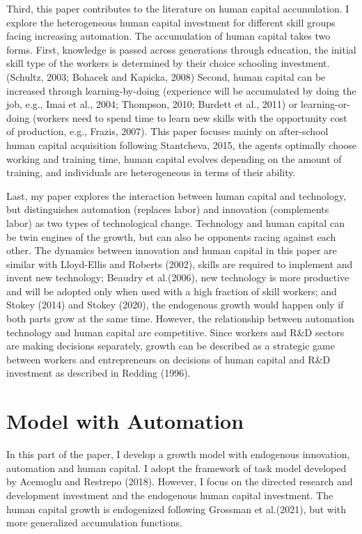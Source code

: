 \documentclass[12pt]{article}
\begin{document}
Third, this paper contributes to the literature on human capital accumulation. I explore the heterogeneous human capital investment for different skill groups facing increasing automation. The accumulation of human capital takes two forms. First, knowledge is passed across generations through education, the initial skill type of the workers is determined by their choice schooling investment. (Schultz, 2003\nocite{Schultz2003}; Bohacek and Kapicka, 2008\nocite{BohacekKapicka2008}) Second, human capital can be increased through learning-by-doing (experience will be accumulated by doing the job, e.g., Imai et al., 2004\nocite{Imaietal2004}; Thompson, 2010\nocite{Thompson2010}; Burdett et al., 2011\nocite{Burdettetal2011}) or learning-or-doing (workers need to spend time to learn new skills with the opportunity cost of production, e.g., Frazis, 2007\nocite{Frazis2007}). This paper focuses mainly on after-school human capital acquisition following Stantcheva, 2015\nocite{Stantcheva2015}, the agents optimally choose working and training time, human capital evolves depending on the amount of training, and individuals are heterogeneous in terms of their ability. 

Last, my paper explores the interaction between human capital and technology, but distinguishes automation (replaces labor) and innovation (complements labor) as two types of technological change. Technology and human capital can be twin engines of the growth, but can also be opponents racing against each other. The dynamics between innovation and human capital in this paper are similar with Lloyd-Ellis and Roberts (2002)\nocite{Lloyd-EllisRoberts2002}, skills are required to implement and invent new technology; Beaudry et al.(2006)\nocite{Beaudryetal2006}, new technology is more productive and will be adopted only when used with a high fraction of skill workers; and Stokey (2014)\nocite{Stokey2014} and Stokey (2020)\nocite{Stokey2020}, the endogenous growth would happen only if both parts grow at the same time. However, the relationship between automation technology and human capital are competitive. Since workers and R\&D sectors are making decisions separately, growth can be described as a strategic game between workers and entrepreneurs on decisions of human capital and R\&D investment as described in Redding (1996)\nocite{Redding1996}.


\section{Model with Automation}
In this part of the paper, I develop a growth model with endogenous innovation, automation and human capital. I adopt the framework of task model developed by Acemoglu and Restrepo (2018)\nocite{AcemogluRestrepo2018}. However, I focus on the directed research and development investment and the endogenous human capital investment. The human capital growth is endogenized following Grossman et al.(2021)\nocite{Grossmanetal2021}, but with more generalized accumulation functions. 
\end{document}
